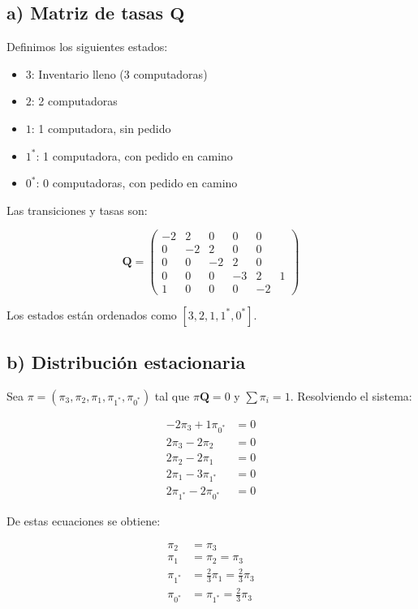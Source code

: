 \documentclass[10pt]{article}
\begin{document}
\subsection*{a) Matriz de tasas $\mathbf{Q}$}

Definimos los siguientes estados:

\begin{itemize}
  \item $3$: Inventario lleno (3 computadoras)
  \item $2$: 2 computadoras
  \item $1$: 1 computadora, sin pedido
  \item $1^*$: 1 computadora, con pedido en camino
  \item $0^*$: 0 computadoras, con pedido en camino
\end{itemize}

Las transiciones y tasas son:

\begin{equation*}
\mathbf{Q} =
\begin{pmatrix}
-2 & 2 & 0 & 0 & 0 \\
0 & -2 & 2 & 0 & 0 \\
0 & 0 & -2 & 2 & 0 \\
0 & 0 & 0 & -3 & 2 & 1 \\
1 & 0 & 0 & 0 & -2
\end{pmatrix}
\end{equation*}

Los estados están ordenados como $[3, 2, 1, 1^*, 0^*]$.

\subsection*{b) Distribución estacionaria}

Sea $\pi = (\pi_3, \pi_2, \pi_1, \pi_{1^*}, \pi_{0^*})$ tal que $\pi \mathbf{Q} = 0$ y $\sum \pi_i = 1$. Resolviendo el sistema:

\begin{align*}
-2\pi_3 + 1\pi_{0^*} &= 0 \\
2\pi_3 - 2\pi_2 &= 0 \\
2\pi_2 - 2\pi_1 &= 0 \\
2\pi_1 - 3\pi_{1^*} &= 0 \\
2\pi_{1^*} - 2\pi_{0^*} &= 0
\end{align*}

De estas ecuaciones se obtiene:

\begin{align*}
\pi_2 &= \pi_3 \\
\pi_1 &= \pi_2 = \pi_3 \\
\pi_{1^*} &= \frac{2}{3}\pi_1 = \frac{2}{3}\pi_3 \\
\pi_{0^*} &= \pi_{1^*} = \frac{2}{3}\pi_3 \\
\end{align*}
\end{document}
